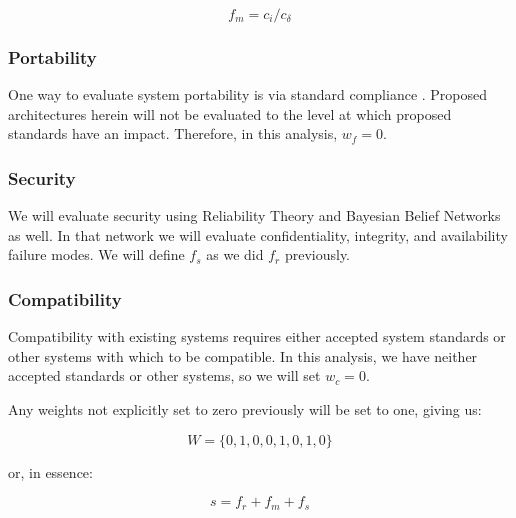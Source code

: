 \begin{equation}
f_{m} = c_{i} / c_{\delta}
\end{equation}

\subsubsection*{Portability}
One way to evaluate system portability is via standard compliance \cite{5958158}.  Proposed architectures herein will not be evaluated to the level at which proposed standards have an impact.  Therefore, in this analysis, $ w_{f} =0 $.

\subsubsection*{Security}
We will evaluate security using Reliability Theory and Bayesian Belief Networks as well.  In that network we will evaluate confidentiality, integrity, and availability failure modes.  We will define $ f_{s} $ as we did $ f_{r} $ previously.

\subsubsection*{Compatibility}
Compatibility with existing systems requires either accepted system standards or other systems with which to be compatible.  In this analysis, we have neither accepted standards or other systems, so we will set $ w_{c} = 0 $.

Any weights not explicitly set to zero previously will be set to one, giving us:

\begin{equation}
W = \lbrace 0, 1, 0, 0, 1, 0, 1, 0 \rbrace
\end{equation}

or, in essence:

\label{equation:final}
\begin{equation}
s = f_{r} + f_{m} + f_{s}
\end{equation}




